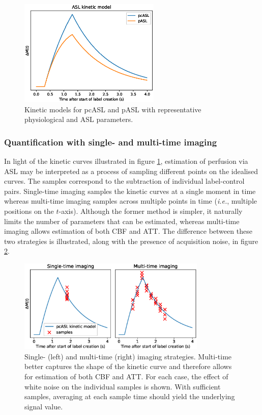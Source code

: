 \documentclass[12pt]{report}
\begin{document}
\begin{figure}[H]
\centering
\includegraphics[width = 0.6\textwidth]{kinetic_curves.eps}
\caption{Kinetic models for pcASL and pASL with representative physiological and ASL parameters.}
\label{kinetic_curves}
\end{figure}

\subsubsection{Quantification with single- and multi-time imaging}

In light of the kinetic curves illustrated in figure \ref{kinetic_curves}, estimation of perfusion via ASL may be interpreted as a process of sampling different points on the idealised curves. The samples correspond to the subtraction of individual label-control pairs. Single-time imaging samples the kinetic curves at a single moment in time whereas multi-time imaging samples across multiple points in time (\textit{i.e.}, multiple positions on the $t$-axis). Although the former method is simpler, it naturally limits the number of parameters that can be estimated, whereas multi-time imaging allows estimation of both CBF and ATT. The difference between these two strategies is illustrated, along with the presence of acquisition noise, in figure \ref{single_multi_noisy}. 

\begin{figure}
\centering
\includegraphics[width = 0.8\textwidth]{single_multi_noisy.eps}
\caption{Single- (left) and multi-time (right) imaging strategies. Multi-time better captures the shape of the kinetic curve and therefore allows for estimation of both CBF and ATT. For each case, the effect of white noise on the individual samples is shown. With sufficient samples, averaging at each sample time should yield the underlying signal value.}
\label{single_multi_noisy}
\end{figure}
\end{document}
